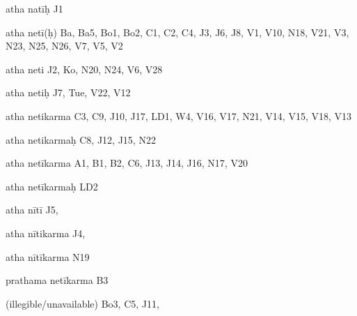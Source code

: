 \begin{ekdosis}
\begin{marma}[hp01_055]
\begin{marma}[hp02_009]
\begin{marma}[hp02_011]
\begin{marma}[hp02_30]
\item[atha natīḥ] J1
\item[atha netī(ḥ)] Ba, Ba5, Bo1, Bo2, C1, C2, C4, J3, J6, J8, V1, V10, N18, V21, V3, N23, N25, N26, V7, V5, V2
\item[atha neti] J2, Ko, N20, N24, V6, V28
\item[atha netiḥ] J7, Tue, V22, V12
\item[atha netikarma] C3, C9, J10, J17, LD1, W4, V16, V17, N21, V14, V15, V18, V13
\item[atha netikarmaḥ] C8, J12, J15, N22
\item[atha netīkarma] A1, B1, B2, C6, J13, J14, J16, N17, V20
\item[atha netīkarmaḥ] LD2
\item[atha nītī] J5,
\item[atha nītikarma] J4,
\item[atha nītīkarma] N19
\item[prathama netīkarma] B3
\item[(illegible/unavailable)] Bo3, C5, J11, 
 \begin{description}

        \end{description}
\end{marma}


\end{marma}
\end{marma}
\end{marma}
\end{ekdosis}
